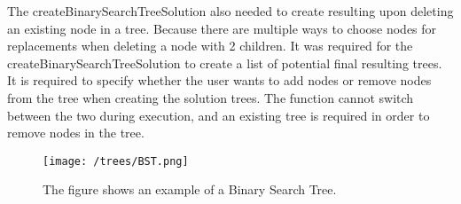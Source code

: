 The createBinarySearchTreeSolution also needed to create resulting upon deleting an existing node in a tree. Because there are multiple ways to choose nodes for replacements when deleting a node with 2 children. It was required for the createBinarySearchTreeSolution to create a list of potential final resulting trees. It is required to specify whether the user wants to add nodes or remove nodes from the tree when creating the solution trees. The function cannot switch between the two during execution, and an existing tree is required in order to remove nodes in the tree.

\begin{figure}
	\centering
	\texttt{[image: /trees/BST.png]}
	\caption{The figure shows an example of a Binary Search Tree.}	
	\label{fig:BST}
\end{figure}
